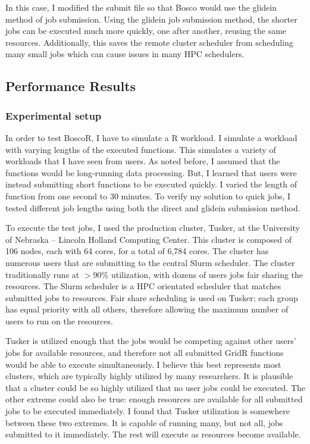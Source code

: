 In this case, I modified the submit file so that Bosco would use the glidein method of job submission.  Using the glidein job submission method, the shorter jobs can be executed much more quickly, one after another, reusing the same resources.  Additionally, this saves the remote cluster scheduler from scheduling many small jobs which can cause issues in many HPC schedulers.


\subsection{Performance Results}

\subsubsection{Experimental setup}  

In order to test BoscoR, I have to simulate a R workload.  I simulate a workload with varying lengths of the executed functions.  This simulates a variety of workloads that I have seen from users.  As noted before, I assumed that the functions would be long-running data processing.  But, I learned that users were instead submitting short functions to be executed quickly.  I varied the length of function from one second to 30 minutes.  To verify my solution to quick jobs, I tested different job lengths using both the direct and glidein submission method.

To execute the test jobs, I used the production cluster, Tusker, at the University of Nebraska -- Lincoln Holland Computing Center.  This cluster is composed of 106 nodes, each with 64 cores, for a total of 6,784 cores.  The cluster has numerous users that are submitting to the central Slurm \cite{yoo2003slurm} scheduler.  The cluster traditionally runs at $>$90\% utilization, with dozens of users jobs fair sharing the resources.  The Slurm scheduler is a HPC orientated scheduler that matches submitted jobs to resources.  Fair share scheduling is used on Tusker;  each group has equal priority with all others, therefore allowing the maximum number of users to run on the resources.

Tusker is utilized enough that the jobs would be competing against other users' jobs for available resources, and therefore not all submitted GridR functions would be able to execute simultaneously.  I believe this best represents most clusters, which are typically highly utilized by many researchers.  It is plausible that a cluster could be so highly utilized that no user jobs could be executed. The other extreme could also be true: enough resources are available for all submitted jobs to be executed immediately.  I found that Tusker utilization is somewhere between these two extremes.  It is capable of running many, but not all, jobs submitted to it immediately.  The rest will execute as resources become available.

